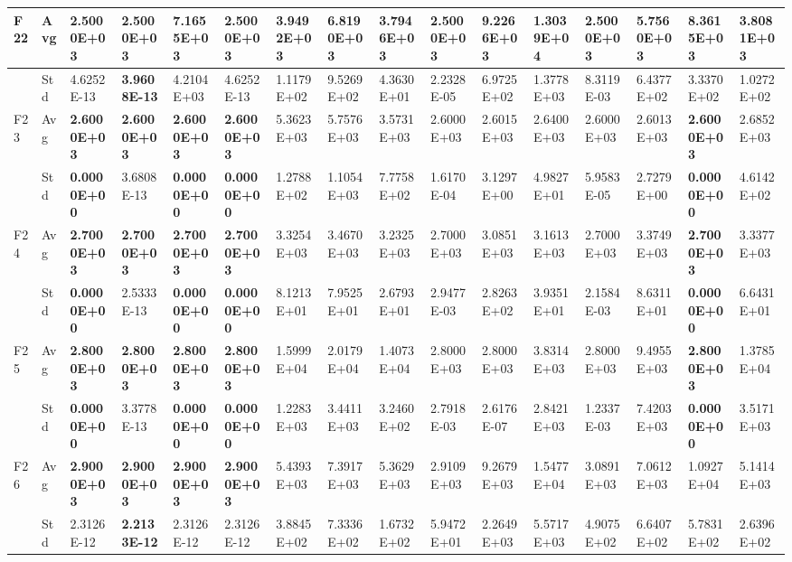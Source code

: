 \documentclass{article} %
\begin{document}
\begin{tabular}{|p{0.3in}|p{0.3in}|p{0.3in}|p{0.3in}|p{0.3in}|p{0.3in}|p{0.3in}|p{0.3in}|p{0.3in}|p{0.3in}|p{0.3in}|p{0.3in}|p{0.3in}|p{0.3in}|p{0.3in}|p{0.5in}|}
F22 & Avg & \textbf{2.5000E+03} & \textbf{2.5000E+03} & 7.1655E+03 & \textbf{2.5000E+03} & 3.9492E+03 & 6.8190E+03 & 3.7946E+03 & 2.5000E+03 & 9.2266E+03 & 1.3039E+04 & 2.5000E+03 & 5.7560E+03 & 8.3615E+03 & 3.8081E+03 \\ \hline 
 & Std & 4.6252E-13 & \textbf{3.9608E-13} & 4.2104E+03 & 4.6252E-13 & 1.1179E+02 & 9.5269E+02 & 4.3630E+01 & 2.2328E-05 & 6.9725E+02 & 1.3778E+03 & 8.3119E-03 & 6.4377E+02 & 3.3370E+02 & 1.0272E+02 \\ \hline 
F23 & Avg & \textbf{2.6000E+03} & \textbf{2.6000E+03} & \textbf{2.6000E+03} & \textbf{2.6000E+03} & 5.3623E+03 & 5.7576E+03 & 3.5731E+03 & 2.6000E+03 & 2.6015E+03 & 2.6400E+03 & 2.6000E+03 & 2.6013E+03 & \textbf{2.6000E+03} & 2.6852E+03 \\ \hline 
 & Std & \textbf{0.0000E+00} & 3.6808E-13 & \textbf{0.0000E+00} & \textbf{0.0000E+00} & 1.2788E+02 & 1.1054E+03 & 7.7758E+02 & 1.6170E-04 & 3.1297E+00 & 4.9827E+01 & 5.9583E-05 & 2.7279E+00 & \textbf{0.0000E+00} & 4.6142E+02 \\ \hline 
F24 & Avg & \textbf{2.7000E+03} & \textbf{2.7000E+03} & \textbf{2.7000E+03} & \textbf{2.7000E+03} & 3.3254E+03 & 3.4670E+03 & 3.2325E+03 & 2.7000E+03 & 3.0851E+03 & 3.1613E+03 & 2.7000E+03 & 3.3749E+03 & \textbf{2.7000E+03} & 3.3377E+03 \\ \hline 
 & Std & \textbf{0.0000E+00} & 2.5333E-13 & \textbf{0.0000E+00} & \textbf{0.0000E+00} & 8.1213E+01 & 7.9525E+01 & 2.6793E+01 & 2.9477E-03 & 2.8263E+02 & 3.9351E+01 & 2.1584E-03 & 8.6311E+01 & \textbf{0.0000E+00} & 6.6431E+01 \\ \hline 
F25 & Avg & \textbf{2.8000E+03} & \textbf{2.8000E+03} & \textbf{2.8000E+03} & \textbf{2.8000E+03} & 1.5999E+04 & 2.0179E+04 & 1.4073E+04 & 2.8000E+03 & 2.8000E+03 & 3.8314E+03 & 2.8000E+03 & 9.4955E+03 & \textbf{2.8000E+03} & 1.3785E+04 \\ \hline 
 & Std & \textbf{0.0000E+00} & 3.3778E-13 & \textbf{0.0000E+00} & \textbf{0.0000E+00} & 1.2283E+03 & 3.4411E+03 & 3.2460E+02 & 2.7918E-03 & 2.6176E-07 & 2.8421E+03 & 1.2337E-03 & 7.4203E+03 & \textbf{0.0000E+00} & 3.5171E+03 \\ \hline 
F26 & Avg & \textbf{2.9000E+03} & \textbf{2.9000E+03} & \textbf{2.9000E+03} & \textbf{2.9000E+03} & 5.4393E+03 & 7.3917E+03 & 5.3629E+03 & 2.9109E+03 & 9.2679E+03 & 1.5477E+04 & 3.0891E+03 & 7.0612E+03 & 1.0927E+04 & 5.1414E+03 \\ \hline 
 & Std & 2.3126E-12 & \textbf{2.2133E-12} & 2.3126E-12 & 2.3126E-12 & 3.8845E+02 & 7.3336E+02 & 1.6732E+02 & 5.9472E+01 & 2.2649E+03 & 5.5717E+03 & 4.9075E+02 & 6.6407E+02 & 5.7831E+02 & 2.6396E+02 \\ \hline 

\end{tabular}
\end{document}
